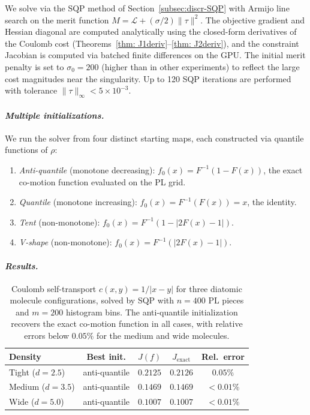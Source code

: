 \documentclass[12pt,leqno]{amsart}
\newcounter{experiment}
\begin{document}
We solve via the SQP method of Section~\ref{subsec:discr-SQP} with Armijo line search on the merit function $M = \mathcal{L} + (\sigma/2)\|\tau\|^2$. The objective gradient and Hessian diagonal are computed analytically using the closed-form derivatives of the Coulomb cost (Theorems~\ref{thm: J1deriv}--\ref{thm: J2deriv}), and the constraint Jacobian is computed via batched finite differences on the GPU. The initial merit penalty is set to $\sigma_0 = 200$ (higher than in other experiments) to reflect the large cost magnitudes near the singularity. Up to 120 SQP iterations are performed with tolerance $\|\tau\|_\infty < 5 \times 10^{-3}$.

\paragraph{\it Multiple initializations.}
We run the solver from four distinct starting maps, each constructed via quantile functions of $\rho$:
\begin{enumerate}
    \item \emph{Anti-quantile} (monotone decreasing): $f_0(x) = F^{-1}(1 - F(x))$, the exact co-motion function evaluated on the PL grid.
    \item \emph{Quantile} (monotone increasing): $f_0(x) = F^{-1}(F(x)) = x$, the identity.
    \item \emph{Tent} (non-monotone): $f_0(x) = F^{-1}(1 - |2F(x) - 1|)$.
    \item \emph{V-shape} (non-monotone): $f_0(x) = F^{-1}(|2F(x) - 1|)$.
\end{enumerate}

\paragraph{\it Results.}

\begin{table}[t]
    \centering
    \caption{Coulomb self-transport $c(x,y) = 1/|x-y|$ for three diatomic molecule configurations, solved by SQP with $n = 400$ PL pieces and $m = 200$ histogram bins. The anti-quantile initialization recovers the exact co-motion function in all cases, with relative errors below $0.05\%$ for the medium and wide molecules.}
    \label{tab:coulomb-results}
    \begin{tabular}{lcccc}
        \toprule
        Density & Best init. & $J(f)$ & $J_{\mathrm{exact}}$ & Rel.\ error \\
        \midrule
        Tight ($d{=}2.5$)  & anti-quantile & $0.2125$ & $0.2126$ & $0.05\%$ \\
        Medium ($d{=}3.5$) & anti-quantile & $0.1469$ & $0.1469$ & $< 0.01\%$ \\
        Wide ($d{=}5.0$)   & anti-quantile & $0.1007$ & $0.1007$ & $< 0.01\%$ \\
        \bottomrule
    \end{tabular}
\end{table}
\end{document}
